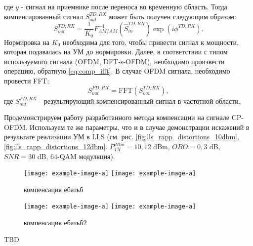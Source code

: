 где $y$ - сигнал на приемнике после переноса во временную область.
Тогда компенсированный сигнал $S^{TD, RX}_{out}$ может быть получен следующим образом:
\begin{equation}
    S^{TD, RX}_{out} = \frac{1}{K_0}F^{-1}_{AM/AM}\left(\hat{S}^{TD, RX}_{in}\right)\exp(i\phi^{TD, RX}).
\end{equation}
Нормировка на $K_0$ необходима для того, чтобы привести сигнал к мощности,
которая подавалась на УМ до нормировки.
Далее, в соответствии с типом используемого сигнала (OFDM, DFT-s-OFDM),
необходимо произвести операцию, обратную \ref{eq:comp_ifft}. В случае OFDM
сигнала, необходимо провести FFT:
\begin{equation}
    S^{FD, RX}_{out} = \text{FFT}\left(S^{TD, RX}_{out}\right),
\end{equation}
где $S^{FD, RX}_{out}$ - результирующий компенсированный сигнал в частотной
области. 

Продемонстрируем работу разработанного метода компенсации на сигнале
CP-OFDM. Используем те же параметры, что и в случае демонстрации искажений
в результате реализации УМ в LLS (см. рис.
\ref{fig:lls_rapp_distortions_10dbm}, \ref{fig:lls_rapp_distortions_12dbm}.
$P^{dBm}_{TX} = 10,12$ dBm, $OBO = 0,3$ dB, $SNR=30$ dB, 64-QAM модуляция). 

\begin{figure}[h!]
    \centering
    \texttt{[image: example-image-a]}
    \texttt{[image: example-image-a]}
    \caption{компенсация ебатьб}
    \label{fig:comp1}
\end{figure}
\begin{figure}[h!]
    \centering
    \texttt{[image: example-image-a]}
    \texttt{[image: example-image-a]}
    \caption{компенсация ебатьб2}
    \label{fig:comp2}
\end{figure}

TBD




